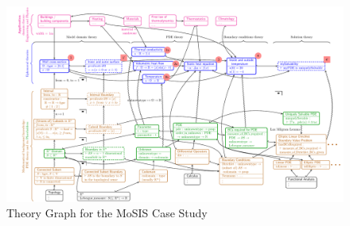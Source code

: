 \begin{figure}[h!p]\centering
  \begin{turn}{-90}
    \includegraphics[width=0.95\textheight]{pde-theory}
  \end{turn}
  \caption{Theory Graph for the MoSIS Case Study}
  \label{fig:pde-theory}
\end{figure}



